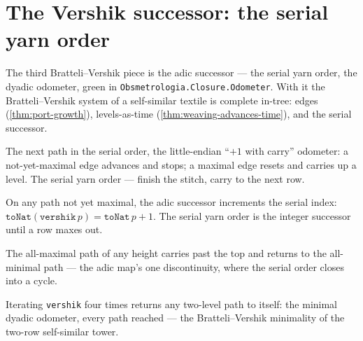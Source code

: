 \section{The Vershik successor: the serial yarn order}

The third Bratteli--Vershik piece is the adic successor --- the serial yarn order, the dyadic
odometer, green in \texttt{Obsmetrologia.Closure.Odometer}. With it the Bratteli--Vershik system of a
self-similar textile is complete in-tree: edges (\cref{thm:port-growth}), levels-as-time
(\cref{thm:weaving-advances-time}), and the serial successor.

\begin{proposition}\label{thm:vershik}\leanok{}
The next path in the serial order, the little-endian ``$+1$ with carry'' odometer: a not-yet-maximal
edge advances and stops; a maximal edge resets and carries up a level. The serial yarn order ---
finish the stitch, carry to the next row.
\end{proposition}

\begin{theorem}\label{thm:vershik-succ}\leanok{}
On any path not yet maximal, the adic successor increments the serial index:
$\texttt{toNat}(\texttt{vershik}\,p) = \texttt{toNat}\,p + 1$. The serial yarn order is the integer
successor until a row maxes out.
\end{theorem}

\begin{theorem}\label{thm:vershik-wrap}\leanok{}
The all-maximal path of any height carries past the top and returns to the all-minimal path --- the
adic map's one discontinuity, where the serial order closes into a cycle.
\end{theorem}

\begin{theorem}\label{thm:vershik-cycle}\leanok{}
Iterating \texttt{vershik} four times returns any two-level path to itself: the minimal dyadic
odometer, every path reached --- the Bratteli--Vershik minimality of the two-row self-similar tower.
\end{theorem}

